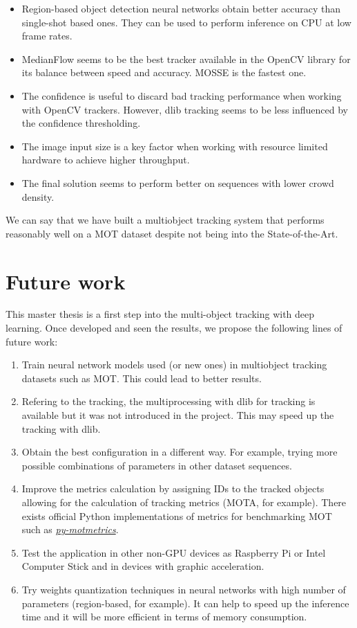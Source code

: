 \begin{itemize}
    \item Region-based object detection neural networks obtain better accuracy than single-shot based ones. They can be used to perform inference on CPU at low frame rates.
    \item MedianFlow seems to be the best tracker available in the OpenCV library for its balance between speed and accuracy. MOSSE is the fastest one.
    \item The confidence is useful to discard bad tracking performance when working with OpenCV trackers. However, dlib tracking seems to be less influenced by the confidence thresholding.
    \item The image input size is a key factor when working with resource limited hardware to achieve higher throughput.
    \item The final solution seems to perform better on sequences with lower crowd density.
\end{itemize}
We can say that we have built a multiobject tracking system that performs reasonably well on a MOT dataset despite not being into the State-of-the-Art.
\section{Future work}
This master thesis is a first step into the multi-object tracking with deep learning. Once developed and seen the results, we propose the following lines of future work:
\begin{enumerate}
    \item Train neural network models used (or new ones) in multiobject tracking datasets such as MOT. This could lead to better results.
    \item Refering to the tracking, the multiprocessing with dlib for tracking is available but it was not introduced in the project. This may speed up the tracking with dlib.
    \item Obtain the best configuration in a different way. For example, trying more possible combinations of parameters in other dataset sequences.
    \item Improve the metrics calculation by assigning IDs to the tracked objects allowing for the calculation of tracking metrics (MOTA, for example). There exists official Python implementations of metrics for benchmarking MOT such as \href{https://github.com/cheind/py-motmetrics}{\textit{py-motmetrics}}.
    \item Test the application in other non-GPU devices as Raspberry Pi or Intel Computer Stick and in devices with graphic acceleration.
    \item Try weights quantization techniques in neural networks with high number of parameters (region-based, for example). It can help to speed up the inference time and it will be more efficient in terms of memory consumption.
\end{enumerate}